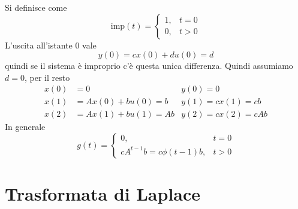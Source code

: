 \documentclass[10pt,a4paper]{book}
\begin{document}
Si definisce come
\begin{equation*}
\mathrm{imp}(t) =\begin{cases}
1, & t=0\\
0, & t >0
\end{cases}
\end{equation*}
L'uscita all'istante $0$ vale
\begin{equation*}
y(0) =cx(0) +du(0) =d
\end{equation*}
quindi se il sistema è improprio c'è questa unica differenza. Quindi assumiamo $d=0$, per il resto
\begin{equation*}
\begin{aligned}
x(0) & =0 & y(0) =0\\
x(1) & =Ax(0) +bu(0) =b & y(1) =cx(1) =cb\\
x(2) & =Ax(1) +bu(1) =Ab & y(2) =cx(2) =cAb
\end{aligned}
\end{equation*}
In generale
\begin{equation*}
\boxed{g(t) =\begin{cases}
0, & t=0\\
cA^{t-1} b=c\phi ( t-1) b, & t >0
\end{cases}
}
\end{equation*}
\section{Trasformata di Laplace}
\end{document}
